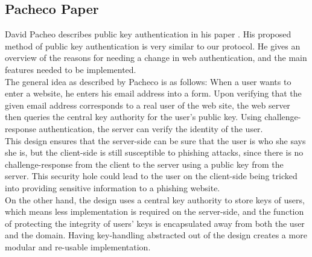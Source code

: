 \documentclass[11pt]{article}
\begin{document}
\subsection{Pacheco Paper}
David Pacheo describes public key authentication in his paper \cite{pacheco}. His proposed method of public key authentication is very similar to our protocol. He gives an overview of the reasons for needing a change in web authentication, and the main features needed to be implemented. \\
The general idea as described by Pacheco is as follows: When a user wants to enter a website, he enters his email address into a form. Upon verifying that the given email address corresponds to a real user of the web site, the web server then queries the central key authority for the user's public key. Using challenge-response authentication, the server can verify the identity of the user.\\
	This design ensures that the server-side can be sure that the user is who she says she is, but the client-side is still susceptible to phishing attacks, since there is no challenge-response from the client to the server using a public key from the server.  This security hole could lead to the user on the client-side being tricked into providing sensitive information to a phishing website.\\
	On the other hand, the design uses a central key authority to store keys of users, which means less implementation is required on the server-side, and the function of protecting the integrity of users' keys is encapsulated away from both the user and the domain.  Having key-handling abstracted out of the design creates a more modular and re-usable implementation.\\
\end{document}
